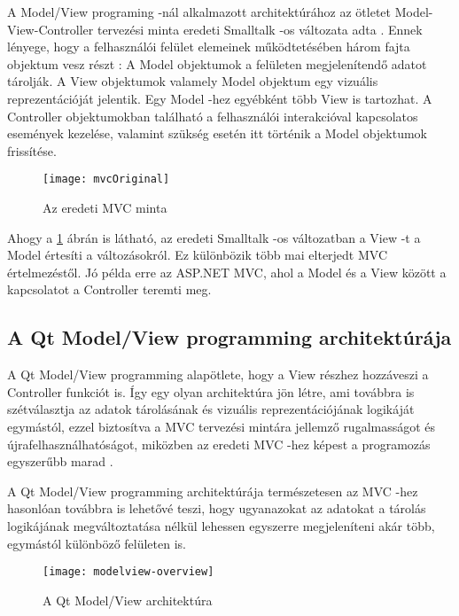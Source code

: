 A Model/View programing -nál alkalmazott architektúrához 
az ötletet Model-View-Controller tervezési minta 
eredeti Smalltalk -os változata adta \cite{qtmodelview}. 
Ennek lényege, hogy a felhasználói felület elemeinek működtetésében 
három fajta objektum vesz részt \cite{mvchistory}: \newline
A Model objektumok a felületen megjelenítendő adatot tárolják.\newline
A View objektumok valamely Model objektum egy vizuális reprezentációját jelentik. 
Egy Model -hez egyébként több View is tartozhat. \newline
A Controller objektumokban található 
a felhasználói interakcióval kapcsolatos események kezelése, 
valamint szükség esetén itt történik a Model objektumok frissítése.
\begin{figure}[!htb]
\centering
\texttt{[image: mvcOriginal]}
\caption{Az eredeti MVC minta \cite{mvcoriginal}}
\label{fig:x mvc}
\end{figure}

Ahogy a \ref{fig:x mvc} ábrán is látható, 
az eredeti Smalltalk -os változatban a View -t a Model értesíti a változásokról. 
Ez különbözik több mai elterjedt MVC értelmezéstől. 
Jó példa erre az ASP.NET MVC, 
ahol a Model és a View között a kapcsolatot a Controller teremti meg.

\subsection{A Qt Model/View programming architektúrája}

A Qt Model/View programming alapötlete, 
hogy a View részhez hozzáveszi a Controller funkciót is. 
Így egy olyan architektúra jön létre, ami továbbra is szétválasztja 
az adatok tárolásának és vizuális reprezentációjának logikáját egymástól, 
ezzel biztosítva a MVC tervezési mintára jellemző 
rugalmasságot és újrafelhasználhatóságot, 
miközben az eredeti MVC -hez képest 
a programozás egyszerűbb marad \cite{qtmodelview}.

A Qt Model/View programming architektúrája természetesen 
az MVC -hez hasonlóan továbbra is lehetővé teszi, 
hogy ugyanazokat az adatokat a tárolás logikájának megváltoztatása 
nélkül lehessen egyszerre megjeleníteni akár több,
egymástól különböző felületen is. 
\begin{figure}[!htb]
\centering
\texttt{[image: modelview-overview]}
\caption{A Qt Model/View architektúra \cite{mvprogramming}}
\label{fig:x QtModelView}
\end{figure}

